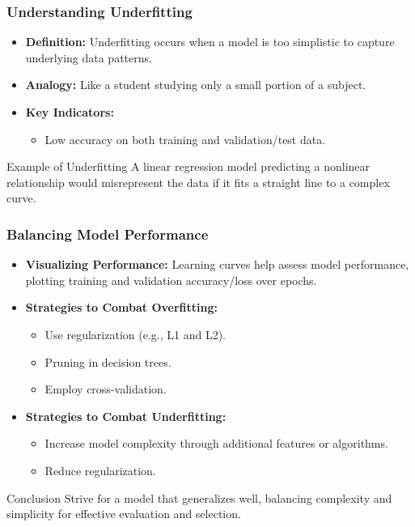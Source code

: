 \documentclass[aspectratio=169]{beamer}
\begin{document}
\begin{frame}[fragile]
    \frametitle{Understanding Underfitting}

    \begin{itemize}
        \item \textbf{Definition:} 
        Underfitting occurs when a model is too simplistic to capture underlying data patterns.
        \item \textbf{Analogy:} 
        Like a student studying only a small portion of a subject.
        \item \textbf{Key Indicators:}
        \begin{itemize}
            \item Low accuracy on both training and validation/test data.
        \end{itemize}
    \end{itemize}

    \begin{block}{Example of Underfitting}
        A linear regression model predicting a nonlinear relationship would misrepresent the data if it fits a straight line to a complex curve.
    \end{block}
\end{frame}

\begin{frame}[fragile]
    \frametitle{Balancing Model Performance}

    \begin{itemize}
        \item \textbf{Visualizing Performance:} 
        Learning curves help assess model performance, plotting training and validation accuracy/loss over epochs.
        
        \item \textbf{Strategies to Combat Overfitting:}
        \begin{itemize}
            \item Use regularization (e.g., L1 and L2).
            \item Pruning in decision trees.
            \item Employ cross-validation.
        \end{itemize}
        
        \item \textbf{Strategies to Combat Underfitting:}
        \begin{itemize}
            \item Increase model complexity through additional features or algorithms.
            \item Reduce regularization.
        \end{itemize}
    \end{itemize}
    
    \begin{block}{Conclusion}
        Strive for a model that generalizes well, balancing complexity and simplicity for effective evaluation and selection.
    \end{block}
\end{frame}
\end{document}
